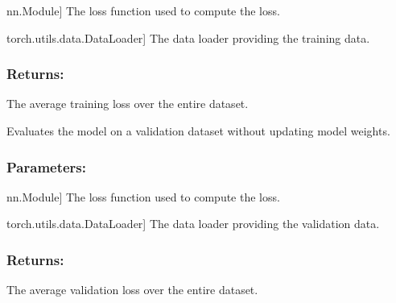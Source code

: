 \documentclass[a4paper,10pt,english]{sphinxmanual}
\begin{document}
\begin{fulllineitems}
\begin{fulllineitems}
\begin{description}
\sphinxlineitem{criterion}{[}nn.Module{]}
\sphinxAtStartPar
The loss function used to compute the loss.

\sphinxlineitem{data\_loader}{[}torch.utils.data.DataLoader{]}
\sphinxAtStartPar
The data loader providing the training data.

\end{description}


\subsubsection{Returns:}
\label{\detokenize{models:id37}}\begin{description}
\sphinxAtStartPar
The average training loss over the entire dataset.

\end{description}

\end{fulllineitems}


\begin{fulllineitems}
\label{\detokenize{models:fireDiff.Models.deterministicmodel.PredictionModel.validate}}
\pysigstartsignatures
{}
\pysigstopsignatures
\sphinxAtStartPar
Evaluates the model on a validation dataset without updating model
weights.


\subsubsection{Parameters:}
\label{\detokenize{models:id38}}\begin{description}
\sphinxlineitem{criterion}{[}nn.Module{]}
\sphinxAtStartPar
The loss function used to compute the loss.

\sphinxlineitem{data\_loader}{[}torch.utils.data.DataLoader{]}
\sphinxAtStartPar
The data loader providing the validation data.

\end{description}


\subsubsection{Returns:}
\label{\detokenize{models:id39}}\begin{description}
\sphinxAtStartPar
The average validation loss over the entire dataset.

\end{description}

\end{fulllineitems}


\end{fulllineitems}
\end{document}

